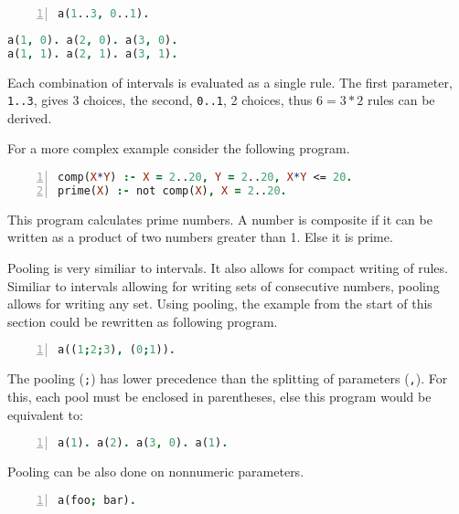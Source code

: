 \documentclass[
    digital,
    color,
    oneside,
    sansbold,
    lot,
    nolof
]{fithesis}
\begin{document}
\begin{minipage}[t]{0.45\linewidth}%
\centering%
\begin{lstlisting}[language=prolog, numbers=left, countblanklines=false]
a(1..3, 0..1).
\end{lstlisting}
\end{minipage}
\hspace{1em}
\begin{minipage}[t]{0.45\linewidth}
\centering
\begin{lstlisting}[language=prolog, numbers=right, countblanklines=false]
a(1, 0). a(2, 0). a(3, 0).
a(1, 1). a(2, 1). a(3, 1).
\end{lstlisting}
\end{minipage}
Each combination of intervals is evaluated as a single rule. The first
parameter, \texttt{1..3}, gives 3 choices, the second, \texttt{0..1}, 2 choices,
thus $6=3*2$ rules can be derived.

For a more complex example consider the following program.
\begin{lstlisting}[language=prolog, numbers=left, countblanklines=false]
comp(X*Y) :- X = 2..20, Y = 2..20, X*Y <= 20.
prime(X) :- not comp(X), X = 2..20.
\end{lstlisting}
This program calculates prime numbers. A number is composite if it can be
written as a product of two numbers greater than 1. Else it is prime.

Pooling is very similiar to intervals. It also allows for compact writing
of rules. Similiar to intervals allowing for writing sets of consecutive numbers,
pooling allows for writing any set. Using pooling, the example from the start
of this section could be rewritten as following program.
\begin{lstlisting}[language=prolog, numbers=left, countblanklines=false]
a((1;2;3), (0;1)).
\end{lstlisting}
The pooling (\texttt{;}) has lower precedence than the splitting of parameters
(\texttt{,}). For this, each pool must be enclosed in parentheses,
else this program would be equivalent to:
\begin{lstlisting}[language=prolog, numbers=left, countblanklines=false]
a(1). a(2). a(3, 0). a(1).
\end{lstlisting}

Pooling can be also done on nonnumeric parameters.
\begin{lstlisting}[language=prolog, numbers=left, countblanklines=false]
a(foo; bar).
\end{lstlisting}
\end{document}
